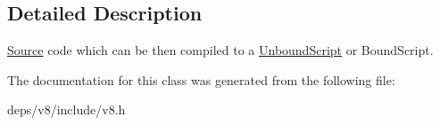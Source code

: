 \subsection{Detailed Description}
\hyperlink{classv8_1_1_script_compiler_1_1_source}{Source} code which can be then compiled to a \hyperlink{classv8_1_1_unbound_script}{Unbound\+Script} or Bound\+Script. 

The documentation for this class was generated from the following file\+:\begin{DoxyCompactItemize}
\item 
deps/v8/include/v8.\+h\end{DoxyCompactItemize}

